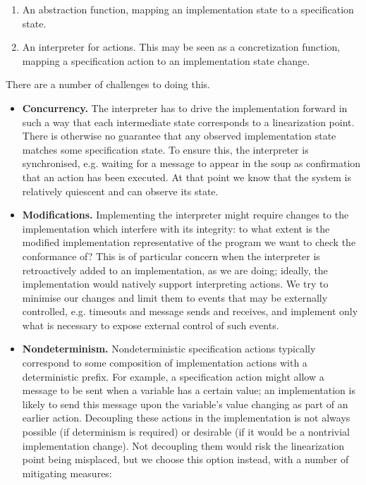 \documentclass[a4paper]{article}
\begin{document}
\begin{enumerate}
    \item An abstraction function, mapping an implementation state to a specification state.

    \item An interpreter for actions. This may be seen as a concretization function, mapping a specification action to an implementation state change.
\end{enumerate}

There are a number of challenges to doing this.

\begin{itemize}
\item \textbf{Concurrency.} The interpreter has to drive the implementation forward in such a way that each intermediate state corresponds to a linearization point.
%
There is otherwise no guarantee that any observed implementation state matches some specification state.
%
To ensure this, the interpreter is synchronised, e.g. waiting for a message to appear in the soup as confirmation that an action has been executed.
%
At that point we know that the system is relatively quiescent and can observe its state.

\item \textbf{Modifications.} Implementing the interpreter might require changes to the implementation which interfere with its integrity: to what extent is the modified implementation representative of the program we want to check the conformance of?
%
This is of particular concern when the interpreter is retroactively added to an implementation, as we are doing; ideally, the implementation would natively support interpreting actions.
%
We try to minimise our changes and limit them to events that may be externally controlled, e.g. timeouts and message sends and receives, and implement only what is necessary to expose external control of such events.


\item \textbf{Nondeterminism.} Nondeterministic specification actions typically correspond to some composition of implementation actions with a deterministic prefix.
%
For example, a specification action might allow a message to be sent when a variable has a certain value; an implementation is likely to send this message upon the variable's value changing as part of an earlier action.
%
Decoupling these actions in the implementation is not always possible (if determinism is required) or desirable (if it would be a nontrivial implementation change).
%
Not decoupling them would risk the linearization point being misplaced, but we choose this option instead, with a number of mitigating measures:


\end{itemize}
\end{document}
